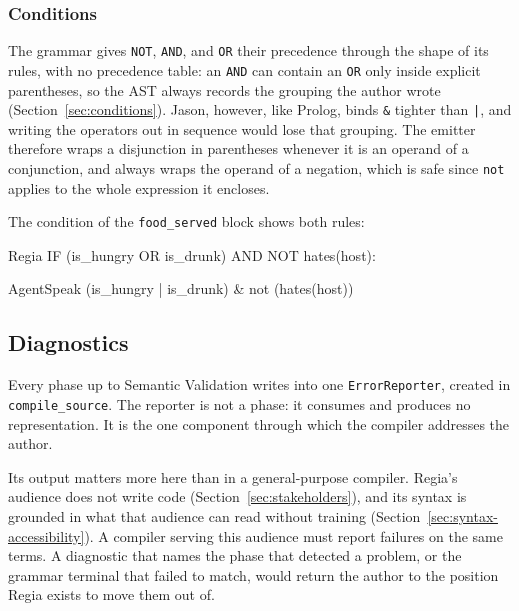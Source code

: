 \subsubsection{Conditions}
 
The grammar gives \lstinline|NOT|, \lstinline|AND|, and \lstinline|OR| their precedence through the shape of its rules, with no precedence table: an \lstinline|AND| can contain an \lstinline|OR| only inside explicit parentheses, so the AST always records the grouping the author wrote (Section~\ref{sec:conditions}). Jason, however, like Prolog, binds \lstinline|&| tighter than \lstinline+|+, and writing the operators out in sequence would lose that grouping. The emitter therefore wraps a disjunction in parentheses whenever it is an operand of a conjunction, and always wraps the operand of a negation, which is safe since \lstinline|not| applies to the whole expression it encloses.
 
The condition of the \lstinline|food_served| block shows both rules:
 
\begin{codeblock}[]{Regia}
IF (is_hungry OR is_drunk) AND NOT hates(host):
\end{codeblock}
 
\begin{codeblock}[]{AgentSpeak}
(is_hungry | is_drunk) & not (hates(host))
\end{codeblock}

 
 
\subsection{Diagnostics}
\label{sec:error-reporting}
 
Every phase up to Semantic Validation writes into one \lstinline|ErrorReporter|, created in \lstinline|compile_source|. The reporter is not a phase: it consumes and produces no representation. It is the one component through which the compiler addresses the author.
 
Its output matters more here than in a general-purpose compiler. Regia's audience does not write code (Section~\ref{sec:stakeholders}), and its syntax is grounded in what that audience can read without training (Section~\ref{sec:syntax-accessibility}). A compiler serving this audience must report failures on the same terms. A diagnostic that names the phase that detected a problem, or the grammar terminal that failed to match, would return the author to the position Regia exists to move them out of.
 
